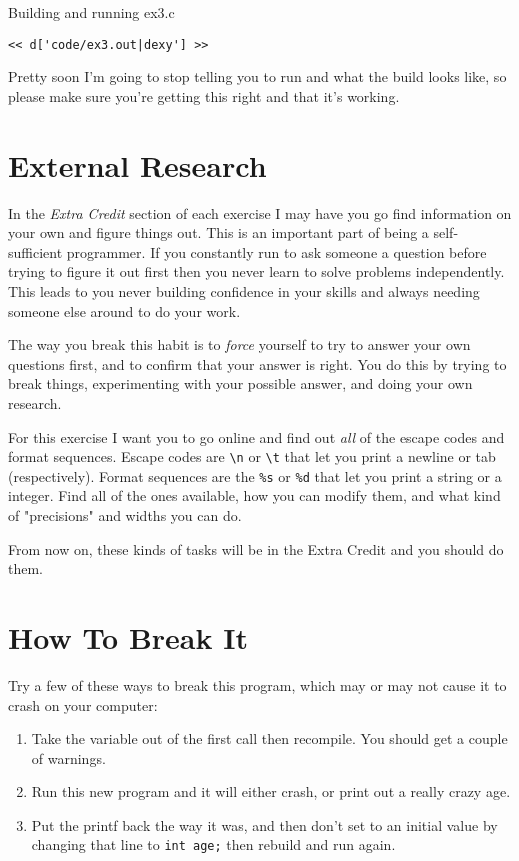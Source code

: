 \begin{Terminal}{Building and running ex3.c}
\begin{lstlisting}
<< d['code/ex3.out|dexy'] >>
\end{lstlisting}
\end{Terminal}

Pretty soon I'm going to stop telling you to run  and what
the build looks like, so please make sure you're getting this right
and that it's working.

\section{External Research}

In the \emph{Extra Credit} section of each exercise I may have you go
find information on your own and figure things out.  This is an important
part of being a self-sufficient programmer.  If you constantly run to
ask someone a question before trying to figure it out first then you
never learn to solve problems independently.  This leads to you never
building confidence in your skills and always needing someone else
around to do your work.

The way you break this habit is to \emph{force} yourself to try to answer
your own questions first, and to confirm that your answer is right.  You
do this by trying to break things, experimenting with your possible answer,
and doing your own research.

For this exercise I want you to go online and find out \emph{all} of the
 escape codes and format sequences.  Escape codes are 
\verb|\n| or \verb|\t| that let you print a newline or tab (respectively).
Format sequences are the \verb|%s| or \verb|%d| that let you print a 
string or a integer.  Find all of the ones available, how you can
modify them, and what kind of "precisions" and widths you can do.

From now on, these kinds of tasks will be in the Extra Credit and you
should do them.

\section{How To Break It}

Try a few of these ways to break this program, which may or may
not cause it to crash on your computer:

\begin{enumerate}
\item Take the  variable out of the first  call
    then recompile. You should get a couple of warnings.
\item Run this new program and it will either crash, or print out a really
    crazy age.
\item Put the printf back the way it was, and then don't set 
    to an initial value by changing that line to \verb|int age;| then
    rebuild and run again.
\end{enumerate}


